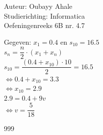 \documentclass[a4paper]{article}
\begin{document}
    
    \noindent \large Auteur: Oubayy Ahale       \\
    \noindent \large Studierichting: Informatica\\
    \noindent \large Oefeningenreeks 6B nr. 4.7 \\
    
    \medskip
    
    \normalsize
    
    Gegeven: $ x_1 = 0.4$ en $s_{10} = 16.5 $\\

    $ s_n = \dfrac{n}{2} \cdot (x_1 + x_n) $\\
	
	$ s_{10} = \dfrac{\left(0.4 + x_{10}\right) \cdot 10}{2} = 16.5 $\\
	
	$ \Leftrightarrow 0.4 + x_{10} = 3.3 $\\
	
	$ \Leftrightarrow x_{10} = 2.9 $\\
	
	$ 2.9 = 0.4 + 9v $\\
	
	$ \Leftrightarrow v = \dfrac{5}{18}$
    
    \begin{thebibliography}{999}
    \end{thebibliography}
    
\end{document}

